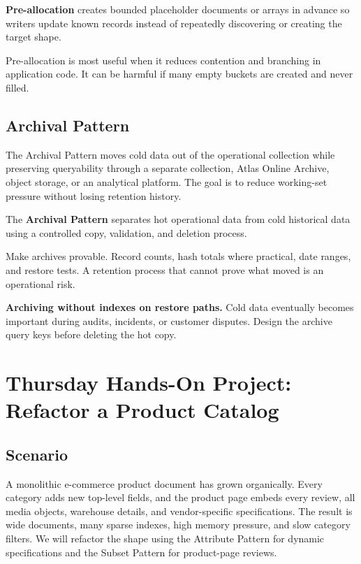 \begin{definitionbox}
\textbf{Pre-allocation} creates bounded placeholder documents or arrays in advance so writers update known records instead of repeatedly discovering or creating the target shape.
\end{definitionbox}

\begin{notebox}
Pre-allocation is most useful when it reduces contention and branching in application code. It can be harmful if many empty buckets are created and never filled.
\end{notebox}

\subsection{Archival Pattern}
The Archival Pattern moves cold data out of the operational collection while preserving queryability through a separate collection, Atlas Online Archive, object storage, or an analytical platform. The goal is to reduce working-set pressure without losing retention history.

\begin{definitionbox}
The \textbf{Archival Pattern} separates hot operational data from cold historical data using a controlled copy, validation, and deletion process.
\end{definitionbox}

\begin{tipbox}
Make archives provable. Record counts, hash totals where practical, date ranges, and restore tests. A retention process that cannot prove what moved is an operational risk.
\end{tipbox}

\begin{pitfall}
\textbf{Archiving without indexes on restore paths.} Cold data eventually becomes important during audits, incidents, or customer disputes. Design the archive query keys before deleting the hot copy.
\end{pitfall}

\section{Thursday Hands-On Project: Refactor a Product Catalog}
\subsection{Scenario}
A monolithic e-commerce product document has grown organically. Every category adds new top-level fields, and the product page embeds every review, all media objects, warehouse details, and vendor-specific specifications. The result is wide documents, many sparse indexes, high memory pressure, and slow category filters. We will refactor the shape using the Attribute Pattern for dynamic specifications and the Subset Pattern for product-page reviews.

